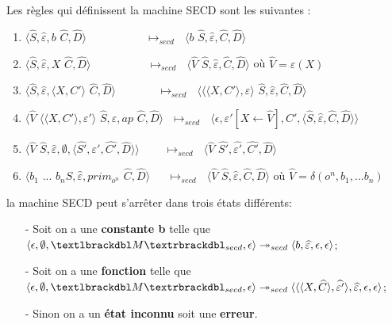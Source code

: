 \documentclass[10pt,a4paper]{report}
\begin{document}
	Les règles qui définissent la machine SECD sont les suivantes :
	\smallbreak
	\begin{enumerate}
		\item $\langle\widehat{S},\widehat{\varepsilon},b$ $\widehat{C},\widehat{D}\rangle 
		~~~~~~~~~~~~~~~~~~~~~~~~\longmapsto_{secd}~~~
		\langle b$ $\widehat{S},\widehat{\varepsilon},\widehat{C},\widehat{D}\rangle$
		
		\item $\langle\widehat{S},\widehat{\varepsilon},X$ $\widehat{C},\widehat{D}\rangle 
		~~~~~~~~~~~~~~~~~~~~~~~\longmapsto_{secd}~~~
		\langle \widehat{V}$ $\widehat{S},\widehat{\varepsilon},\widehat{C},\widehat{D}\rangle$ où $\widehat{V} = \varepsilon(X)$
		
		\item $\langle\widehat{S},\widehat{\varepsilon},\langle X,C'\rangle$ $\widehat{C},\widehat{D}\rangle ~~~~~~~~~~~~~~~~~\longmapsto_{secd}~~~
		\langle\langle\langle X,C'\rangle,\varepsilon\rangle$ $\widehat{S},\widehat{\varepsilon},\widehat{C},\widehat{D}\rangle$
		
		\item $\langle\widehat{V}$ $\langle\langle X,C'\rangle,\varepsilon'\rangle$ $\widehat{S},\widehat{\varepsilon},ap$ $\widehat{C},\widehat{D}\rangle 
		~~~\longmapsto_{secd}~~~
		\langle\epsilon,\varepsilon'[X \leftarrow \widehat{V}],C',\langle\widehat{S},\widehat{\varepsilon},\widehat{C},\widehat{D}\rangle\rangle$
		
		\item $\langle\widehat{V}$ $\widehat{S},\widehat{\varepsilon},\emptyset,\langle\widehat{S'},\widehat{\varepsilon'},\widehat{C'},\widehat{D}\rangle\rangle
		~~~~~~~~~~\longmapsto_{secd}~~~
		\langle \widehat{V}$ $\widehat{S'},\widehat{\varepsilon'},\widehat{C'},\widehat{D}\rangle$
		
		\item $\langle b_{1}$ $...$ $b_{n}\widehat{S},\widehat{\varepsilon},prim_{o^{n}}$ $\widehat{C},\widehat{D}\rangle
		~~~~~~~\longmapsto_{secd}~~~
		\langle \widehat{V}$ $\widehat{S},\widehat{\varepsilon},\widehat{C},\widehat{D}\rangle$ où $\widehat{V} = \delta(o^{n},b_1,...b_{n})$
	\end{enumerate}
	\bigbreak
	
	
	la machine SECD peut s'arrêter dans trois états différents:
	\begin{itemize}
		\item[-] Soit on a une \textbf{constante b} telle que $\langle \epsilon,\emptyset,\textlbrackdbl M\textrbrackdbl_{secd},\epsilon\rangle \twoheadrightarrow_{secd} \langle b,\widehat{\varepsilon},\epsilon,\epsilon\rangle$;
		\item[-] Soit on a une \textbf{fonction} telle que $\langle \epsilon,\emptyset,\textlbrackdbl M\textrbrackdbl_{secd},\epsilon\rangle \twoheadrightarrow_{secd} \langle\langle\langle X,\widehat{C}\rangle,\widehat{\varepsilon'}\rangle,\widehat{\varepsilon},\epsilon,\epsilon\rangle$;
		\item[-] Sinon on a un \textbf{état inconnu} soit une \textbf{erreur}.
	\end{itemize}
	\bigbreak
	
\end{document}
